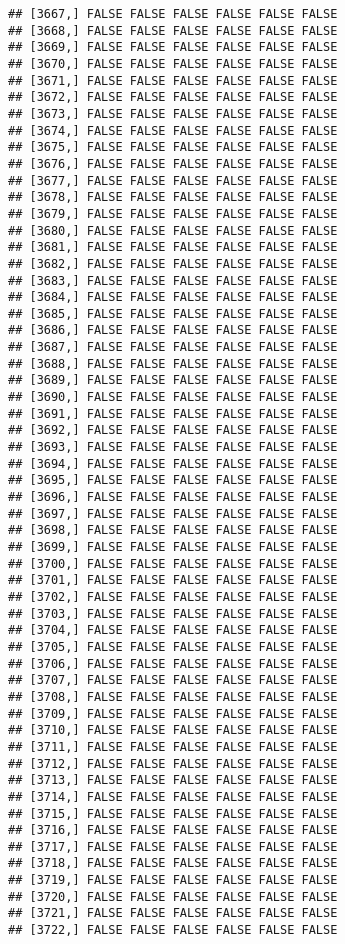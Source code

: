 \documentclass[
]{article}
\begin{document}
\begin{verbatim}
## [3667,] FALSE FALSE FALSE FALSE FALSE FALSE
## [3668,] FALSE FALSE FALSE FALSE FALSE FALSE
## [3669,] FALSE FALSE FALSE FALSE FALSE FALSE
## [3670,] FALSE FALSE FALSE FALSE FALSE FALSE
## [3671,] FALSE FALSE FALSE FALSE FALSE FALSE
## [3672,] FALSE FALSE FALSE FALSE FALSE FALSE
## [3673,] FALSE FALSE FALSE FALSE FALSE FALSE
## [3674,] FALSE FALSE FALSE FALSE FALSE FALSE
## [3675,] FALSE FALSE FALSE FALSE FALSE FALSE
## [3676,] FALSE FALSE FALSE FALSE FALSE FALSE
## [3677,] FALSE FALSE FALSE FALSE FALSE FALSE
## [3678,] FALSE FALSE FALSE FALSE FALSE FALSE
## [3679,] FALSE FALSE FALSE FALSE FALSE FALSE
## [3680,] FALSE FALSE FALSE FALSE FALSE FALSE
## [3681,] FALSE FALSE FALSE FALSE FALSE FALSE
## [3682,] FALSE FALSE FALSE FALSE FALSE FALSE
## [3683,] FALSE FALSE FALSE FALSE FALSE FALSE
## [3684,] FALSE FALSE FALSE FALSE FALSE FALSE
## [3685,] FALSE FALSE FALSE FALSE FALSE FALSE
## [3686,] FALSE FALSE FALSE FALSE FALSE FALSE
## [3687,] FALSE FALSE FALSE FALSE FALSE FALSE
## [3688,] FALSE FALSE FALSE FALSE FALSE FALSE
## [3689,] FALSE FALSE FALSE FALSE FALSE FALSE
## [3690,] FALSE FALSE FALSE FALSE FALSE FALSE
## [3691,] FALSE FALSE FALSE FALSE FALSE FALSE
## [3692,] FALSE FALSE FALSE FALSE FALSE FALSE
## [3693,] FALSE FALSE FALSE FALSE FALSE FALSE
## [3694,] FALSE FALSE FALSE FALSE FALSE FALSE
## [3695,] FALSE FALSE FALSE FALSE FALSE FALSE
## [3696,] FALSE FALSE FALSE FALSE FALSE FALSE
## [3697,] FALSE FALSE FALSE FALSE FALSE FALSE
## [3698,] FALSE FALSE FALSE FALSE FALSE FALSE
## [3699,] FALSE FALSE FALSE FALSE FALSE FALSE
## [3700,] FALSE FALSE FALSE FALSE FALSE FALSE
## [3701,] FALSE FALSE FALSE FALSE FALSE FALSE
## [3702,] FALSE FALSE FALSE FALSE FALSE FALSE
## [3703,] FALSE FALSE FALSE FALSE FALSE FALSE
## [3704,] FALSE FALSE FALSE FALSE FALSE FALSE
## [3705,] FALSE FALSE FALSE FALSE FALSE FALSE
## [3706,] FALSE FALSE FALSE FALSE FALSE FALSE
## [3707,] FALSE FALSE FALSE FALSE FALSE FALSE
## [3708,] FALSE FALSE FALSE FALSE FALSE FALSE
## [3709,] FALSE FALSE FALSE FALSE FALSE FALSE
## [3710,] FALSE FALSE FALSE FALSE FALSE FALSE
## [3711,] FALSE FALSE FALSE FALSE FALSE FALSE
## [3712,] FALSE FALSE FALSE FALSE FALSE FALSE
## [3713,] FALSE FALSE FALSE FALSE FALSE FALSE
## [3714,] FALSE FALSE FALSE FALSE FALSE FALSE
## [3715,] FALSE FALSE FALSE FALSE FALSE FALSE
## [3716,] FALSE FALSE FALSE FALSE FALSE FALSE
## [3717,] FALSE FALSE FALSE FALSE FALSE FALSE
## [3718,] FALSE FALSE FALSE FALSE FALSE FALSE
## [3719,] FALSE FALSE FALSE FALSE FALSE FALSE
## [3720,] FALSE FALSE FALSE FALSE FALSE FALSE
## [3721,] FALSE FALSE FALSE FALSE FALSE FALSE
## [3722,] FALSE FALSE FALSE FALSE FALSE FALSE

\end{verbatim}
\end{document}

